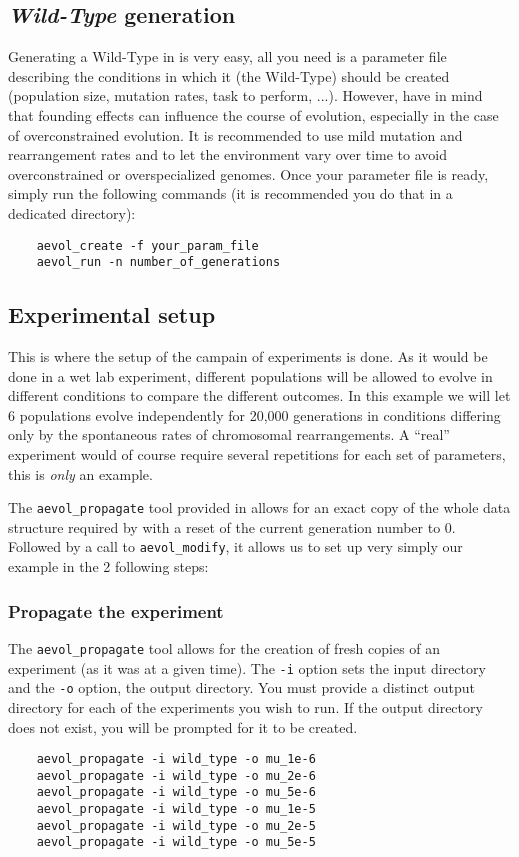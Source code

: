 \subsection{\emph{Wild-Type} generation}
Generating a Wild-Type in \aevol{} is very easy, all you need is a parameter file describing the conditions in which it (the Wild-Type) should be created (population size, mutation rates, task to perform, ...).
However, have in mind that founding effects can influence the course of evolution, especially in the case of overconstrained evolution. It is recommended to use mild mutation and rearrangement rates and to let the environment vary over time to avoid overconstrained or overspecialized genomes.
Once your parameter file is ready, simply run the following commands (it is recommended you do that in a dedicated directory):

\begin{verbatim}
	aevol_create -f your_param_file
	aevol_run -n number_of_generations
\end{verbatim}



\subsection{Experimental setup}
This is where the setup of the campain of experiments is done.
As it would be done in a wet lab experiment, different populations will be allowed to evolve in different conditions to compare the different outcomes. In this example we will let 6 populations evolve independently for 20,000 generations in conditions differing only by the spontaneous rates of chromosomal rearrangements. A ``real'' experiment would of course require several repetitions for each set of parameters, this is \emph{only} an example.

The \verb?aevol_propagate? tool provided in \aevol{} allows for an exact copy of the whole data structure required by \aevol{} with a reset of the current generation number to 0. Followed by a call to \verb?aevol_modify?, it allows us to set up very simply our example in the 2 following steps:


\subsubsection{Propagate the experiment}
The \verb?aevol_propagate? tool allows for the creation of fresh copies of an experiment (as it was at a given time). The \verb?-i? option sets the input directory and the \verb?-o? option, the output directory. You must provide a distinct output directory for each of the experiments you wish to run. If the output directory does not exist, you will be prompted for it to be created.
\begin{verbatim}
	aevol_propagate -i wild_type -o mu_1e-6
	aevol_propagate -i wild_type -o mu_2e-6
	aevol_propagate -i wild_type -o mu_5e-6
	aevol_propagate -i wild_type -o mu_1e-5
	aevol_propagate -i wild_type -o mu_2e-5
	aevol_propagate -i wild_type -o mu_5e-5
\end{verbatim}

